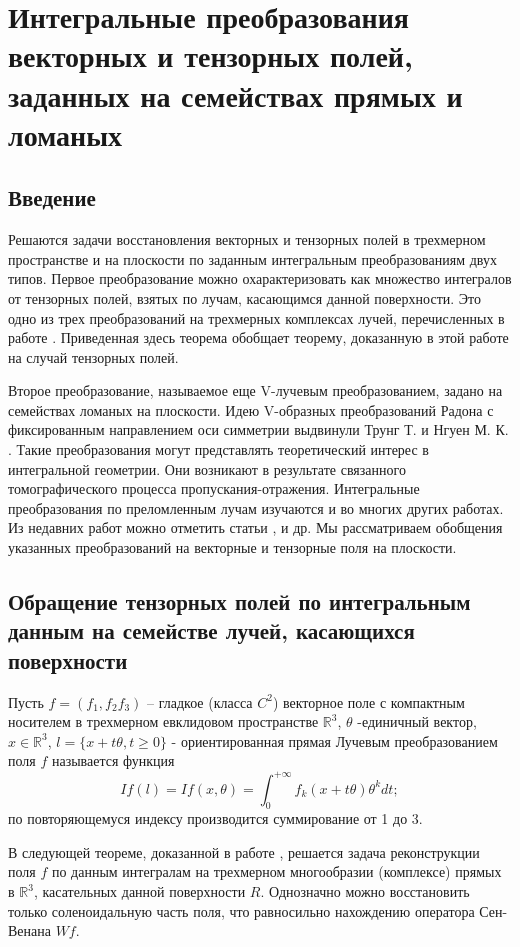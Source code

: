 \chapter{Интегральные преобразования векторных и тензорных полей, заданных на семействах прямых и ломаных}

\section{Введение}
Решаются задачи восстановления векторных и тензорных полей в трехмерном пространстве и на плоскости по заданным интегральным преобразованиям двух типов. Первое преобразование можно охарактеризовать как множество интегралов от тензорных полей, взятых по лучам, касающимся данной поверхности. Это одно из трех преобразований на трехмерных комплексах лучей, перечисленных в работе \cite{Medzhidov}. Приведенная здесь теорема обобщает теорему, доказанную в этой работе на случай тензорных полей.

Второе преобразование, называемое еще V-лучевым преобразованием, задано на семействах ломаных на плоскости. Идею V-образных преобразований Радона с фиксированным направлением оси симметрии выдвинули Трунг Т. и Нгуен М. К. \cite{Truong}. Такие преобразования могут представлять теоретический интерес в интегральной геометрии. Они возникают в результате связанного томографического процесса пропускания-отражения. Интегральные преобразования по преломленным лучам изучаются и во многих других работах. Из недавних работ можно отметить статьи \cite{Sharafutdinov}, \cite{Ambartsoumian}  и др.
Мы рассматриваем обобщения указанных преобразований на векторные и тензорные поля на плоскости.

\section{Обращение тензорных полей по интегральным данным на семействе лучей, касающихся поверхности}

Пусть $f=\left(f_1, f_2 f_3\right)$ -- гладкое (класса $C^2$) векторное поле с компактным носителем в трехмерном евклидовом пространстве $\mathbb R^3$, $\theta$ -единичный вектор, $x\in \mathbb R^3$,  $l=\{x+t\theta, t\geq 0\}$ - ориентированная прямая Лучевым преобразованием поля $f$ называется функция
$$If(l)=If(x,\theta)=\int_0^{+\infty}f_k(x+t\theta)\theta^kdt;$$
по повторяющемуся индексу производится суммирование от 1 до 3.

В следующей теореме, доказанной в работе \cite{Medzhidov}, решается задача реконструкции поля  $f$ по данным интегралам   на трехмерном многообразии (комплексе) прямых в  $\mathbb R^3$, касательных данной поверхности $R$. Однозначно можно восстановить только соленоидальную часть поля, что  равносильно нахождению оператора Сен-Венана $Wf$.

